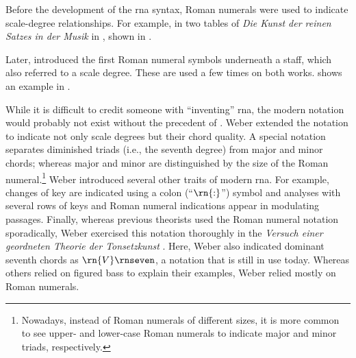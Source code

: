 



Before the development of the \gls{rna} syntax, Roman
numerals were used to indicate scale-degree relationships.
For example, in two tables of \emph{Die Kunst der reinen
Satzes in der Musik} in \textcite{kirnberger1774kunst},
shown in .


Later, \textcite{vogler1778grunde, vogler1802handbuch}
introduced the first Roman numeral symbols underneath a
staff, which also referred to a scale degree. These are used
a few times on both works.
 shows an
example in \textcite{vogler1778grunde}.


While it is difficult to credit someone with ``inventing''
\gls{rna}, the modern notation would probably not exist
without the precedent of \textcite{weber1817versuch}. Weber
extended the notation to indicate not only scale degrees but
their chord quality. A special notation separates diminished
triads (i.e., the seventh degree) from major and minor
chords; whereas major and minor are distinguished by the
size of the Roman numeral.\footnote{Nowadays, instead of
Roman numerals of different sizes, it is more common to see
upper- and lower-case Roman numerals to indicate major and
minor triads, respectively.} Weber introduced several other
traits of modern \gls{rna}. For example, changes of key are
indicated using a colon (``$\rn{:}$'') symbol and analyses
with several rows of keys and Roman numeral indications
appear in modulating passages. Finally, whereas previous
theorists used the Roman numeral notation sporadically,
Weber exercised this notation thoroughly in the
\emph{Versuch einer geordneten Theorie der Tonsetzkunst}
\parencite{weber1817versuch}. Here, Weber also indicated
dominant seventh chords as $\rn{V}\rnseven$, a notation that
is still in use today. Whereas others relied on figured bass
to explain their examples, Weber relied mostly on Roman
numerals.
